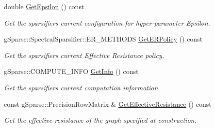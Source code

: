 \begin{DoxyCompactItemize}
double \mbox{\hyperlink{classg_sparse_1_1_spectral_sparsifier_1_1_e_r_sampling_a57a513740f9eff3113b518132c60cb0a}{Get\+Epsilon}} () const
\begin{DoxyCompactList}\small\item\em Get the sparsifier\textquotesingle{}s current configuration for hyper-\/parameter Epsilon. \end{DoxyCompactList}\item 
\mbox{\label{classg_sparse_1_1_spectral_sparsifier_1_1_e_r_sampling_a9db84943ae4c2ff370ef59bcdc5c255c}} 
g\+Sparse\+::\+Spectral\+Sparsifier\+::\+E\+R\+\_\+\+M\+E\+T\+H\+O\+DS \mbox{\hyperlink{classg_sparse_1_1_spectral_sparsifier_1_1_e_r_sampling_a9db84943ae4c2ff370ef59bcdc5c255c}{Get\+E\+R\+Policy}} () const
\begin{DoxyCompactList}\small\item\em Get the sparsifier\textquotesingle{}s current Effective Resistance policy. \end{DoxyCompactList}\item 
\mbox{\label{classg_sparse_1_1_spectral_sparsifier_1_1_e_r_sampling_a898a55838f700015cdfa999b2b0fabe8}} 
g\+Sparse\+::\+C\+O\+M\+P\+U\+T\+E\+\_\+\+I\+N\+FO \mbox{\hyperlink{classg_sparse_1_1_spectral_sparsifier_1_1_e_r_sampling_a898a55838f700015cdfa999b2b0fabe8}{Get\+Info}} () const
\begin{DoxyCompactList}\small\item\em Get the sparsifier\textquotesingle{}s current computation information. \end{DoxyCompactList}\item 
\mbox{\label{classg_sparse_1_1_spectral_sparsifier_1_1_e_r_sampling_a4b0ef0dc57feea2b927c86d1cd422273}} 
const g\+Sparse\+::\+Precision\+Row\+Matrix \& \mbox{\hyperlink{classg_sparse_1_1_spectral_sparsifier_1_1_e_r_sampling_a4b0ef0dc57feea2b927c86d1cd422273}{Get\+Effective\+Resistance}} () const
\begin{DoxyCompactList}\small\item\em Get the effective resistance of the graph specified at construction. \end{DoxyCompactList}\end{DoxyCompactItemize}
